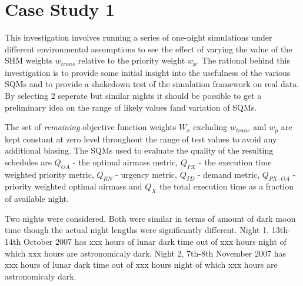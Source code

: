 \section{Case Study 1}
\label{sect:cs1_study}
This investigation involves running a series of one-night simulations under different environmental assumptions to see the effect of varying the value of the SHM weights $w_{trans}$ relative to the priority weight $w_p$.
The rational behind this investigation is to provide some initial insight into the usefulness of the various SQMs and to provide a shakedown test of the simulation framework on real data. By selecting 2 seperate but similar nights it should be possible to get a preliminary idea on the range of likely values fand variation of SQMs.


 The set of \emph{remaining} objective function weights ${W_x}$ excluding $w_{trans}$ and $w_p$ are kept constant at zero level throughout the range of test values to avoid any additional biasing. The SQMs used to evaluate the quality of the resulting schedules are $Q_{OA}$ - the optimal airmass metric, $Q_{PX}$ - the execution time weighted priority metric, $Q_{RN}$ - urgency metric, $Q_{TD}$ - demand metric, $Q_{PX \cdot OA}$ - priority weighted optimal airmass and $Q_X$ the total execution time as a fraction of available night. 

Two nights were considered. Both were similar in terms of amount of dark moon time though the actual night lengths were significantly different. Night 1, 13th-14th October 2007 has xxx hours of lunar dark time out of xxx hours night of which xxx hours are astronomicaly dark. Night 2, 7th-8th November 2007 has xxx hours of lunar dark time out of xxx hours night of which xxx hours are astronomicaly dark.


